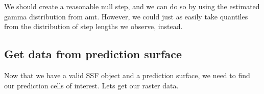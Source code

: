 \documentclass[
]{article}
\newenvironment{Shaded}{\begin{snugshade}}{\end{snugshade}}
\newcommand{\AttributeTok}[1]{\textcolor[rgb]{0.77,0.63,0.00}{#1}}
\newcommand{\CommentTok}[1]{\textcolor[rgb]{0.56,0.35,0.01}{\textit{#1}}}
\newcommand{\ControlFlowTok}[1]{\textcolor[rgb]{0.13,0.29,0.53}{\textbf{#1}}}
\newcommand{\FunctionTok}[1]{\textcolor[rgb]{0.00,0.00,0.00}{#1}}
\newcommand{\NormalTok}[1]{#1}
\newcommand{\OtherTok}[1]{\textcolor[rgb]{0.56,0.35,0.01}{#1}}
\newcommand{\SpecialCharTok}[1]{\textcolor[rgb]{0.00,0.00,0.00}{#1}}
\newcommand{\StringTok}[1]{\textcolor[rgb]{0.31,0.60,0.02}{#1}}
\begin{document}
We should create a reasonable null step, and we can do so by using the
estimated gamma distribution from amt. However, we could just as easily
take quantiles from the distribution of step lengths we observe,
instead.

\begin{Shaded}
\end{Shaded}

\hypertarget{get-data-from-prediction-surface}{%
\subsection{Get data from prediction
surface}\label{get-data-from-prediction-surface}}

Now that we have a valid SSF object and a prediction surface, we need to
find our prediction cells of interest. Lets get our raster data.
\end{document}
